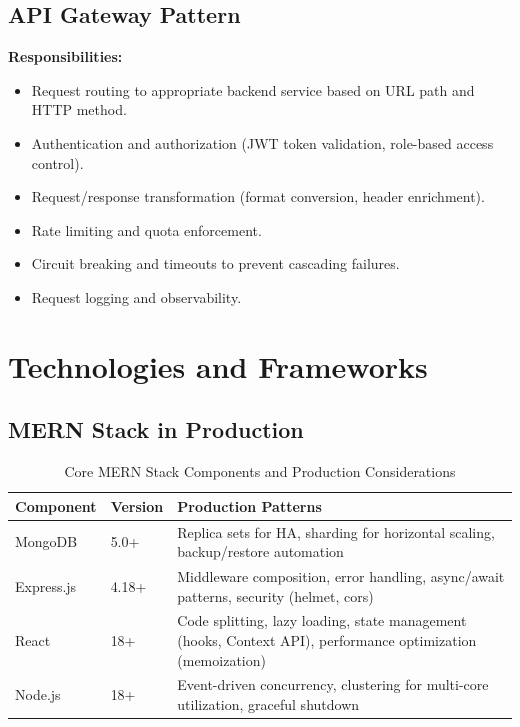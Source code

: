 \documentclass[12pt,a4paper]{report}
\begin{document}
\subsection{API Gateway Pattern}

\textbf{Responsibilities:}
\begin{itemize}
    \item Request routing to appropriate backend service based on URL path and HTTP method.
    \item Authentication and authorization (JWT token validation, role-based access control).
    \item Request/response transformation (format conversion, header enrichment).
    \item Rate limiting and quota enforcement.
    \item Circuit breaking and timeouts to prevent cascading failures.
    \item Request logging and observability.
\end{itemize}

\section{Technologies and Frameworks}

\subsection{MERN Stack in Production}

\begin{table}[H]
\centering
\caption{Core MERN Stack Components and Production Considerations}
\begin{tabular}{p{2cm} p{2.5cm} p{5.5cm}}
\toprule
\textbf{Component} & \textbf{Version} & \textbf{Production Patterns} \\
\midrule
MongoDB & 5.0+ & Replica sets for HA, sharding for horizontal scaling, backup/restore automation \\
Express.js & 4.18+ & Middleware composition, error handling, async/await patterns, security (helmet, cors) \\
React & 18+ & Code splitting, lazy loading, state management (hooks, Context API), performance optimization (memoization) \\
Node.js & 18+ & Event-driven concurrency, clustering for multi-core utilization, graceful shutdown \\
\bottomrule
\end{tabular}
\end{table}
\end{document}
